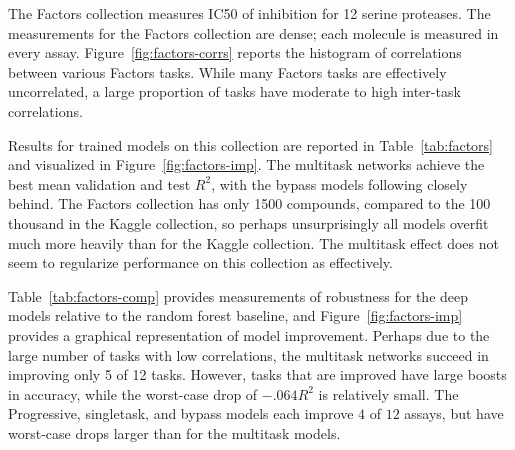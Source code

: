The Factors collection measures IC50 of inhibition for 12 serine proteases. The measurements for the Factors collection are dense; each molecule is measured in every assay. Figure~\ref{fig:factors-corrs} reports the histogram of correlations between various Factors tasks. While many Factors tasks are effectively uncorrelated, a large proportion of tasks have moderate to high inter-task correlations.

Results for trained models on this collection are reported in Table~\ref{tab:factors} and visualized in Figure~\ref{fig:factors-imp}. The multitask networks achieve the best mean validation and test $R^2$, with the bypass models following closely behind. The Factors collection has only 1500 compounds, compared to the 100 thousand in the Kaggle collection, so perhaps unsurprisingly all models overfit much more heavily than for the Kaggle collection. The multitask effect does not seem to regularize performance on this collection as effectively.

Table~\ref{tab:factors-comp} provides measurements of robustness for the deep models relative to the random forest baseline, and Figure~\ref{fig:factors-imp} provides a graphical representation of model improvement. Perhaps due to the large number of tasks with low correlations, the multitask networks succeed in improving only 5 of 12 tasks. However, tasks that are improved have large boosts in accuracy, while the worst-case drop of $-.064 R^2$ is relatively small. The Progressive, singletask, and bypass models each improve $4$ of $12$ assays, but have worst-case drops larger than for the multitask models.

